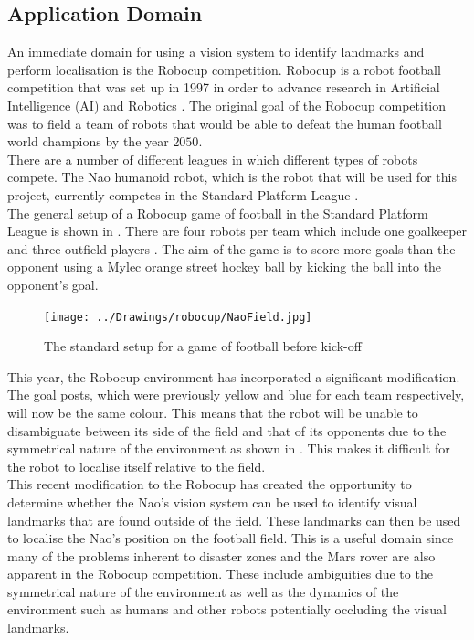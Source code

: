\subsection{Application Domain}
\label{sec:domain}
An immediate domain for using a vision system to identify landmarks and perform localisation is the Robocup competition. Robocup is a robot football competition that was set up in 1997 in order to advance research in Artificial Intelligence (AI) and Robotics \citep{Robocup}. The original goal of the Robocup competition was to field a team of robots that would be able to defeat the human football world champions by the year $2050$.\\

There are a number of different leagues in which different types of robots compete. The Nao humanoid robot, which is the robot that will be used for this project, currently competes in the Standard Platform League \citep{StandardPlatform}.\\

The general setup of a Robocup game of football in the Standard Platform League is shown in . There are four robots per team which include one goalkeeper and three outfield players \citep{Rules}. The aim of the game is to score more goals than the opponent using a Mylec orange street hockey ball by kicking the ball into the opponent's goal.\\

\begin{figure}[h!] 
  \centering
    \texttt{[image: ../Drawings/robocup/NaoField.jpg]}
    \caption{The standard setup for a game of football before kick-off \citep{Rules}}
    \label{fig:naofield}
\end{figure}

This year, the Robocup environment has incorporated a significant modification. The goal posts, which were previously yellow and blue for each team respectively, will now be the same colour. This means that the robot will be unable to disambiguate between its side of the field and that of its opponents due to the symmetrical nature of the environment as shown in . This makes it difficult for the robot to localise itself relative to the field.\\

This recent modification to the Robocup has created the opportunity to determine whether the Nao's vision system can be used to identify visual landmarks that are found outside of the field. These landmarks can then be used to localise the Nao's position on the football field. This is a useful domain since many of the problems inherent to disaster zones and the Mars rover are also apparent in the Robocup competition. These include ambiguities due to the symmetrical nature of the environment as well as the dynamics of the environment such as humans and other robots potentially occluding the visual landmarks.\\

